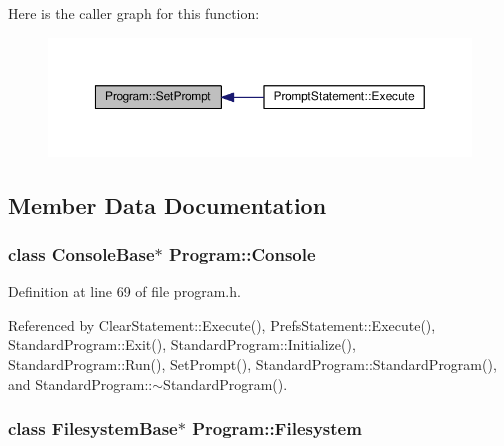 Here is the caller graph for this function\+:
\nopagebreak
\begin{figure}[H]
\begin{center}
\leavevmode
\includegraphics[width=350pt]{dc/db5/classProgram_a517c5f08c0c0dd7f79de6fbf0e62aac6_icgraph}
\end{center}
\end{figure}




\subsection{Member Data Documentation}
\subsubsection[{\texorpdfstring{Console}{Console}}]{\setlength{\rightskip}{0pt plus 5cm}class {\bf Console\+Base}$\ast$ Program\+::\+Console}\hypertarget{classProgram_a7edba60e839230f20ce29716567bc892}{}\label{classProgram_a7edba60e839230f20ce29716567bc892}


Definition at line 69 of file program.\+h.



Referenced by Clear\+Statement\+::\+Execute(), Prefs\+Statement\+::\+Execute(), Standard\+Program\+::\+Exit(), Standard\+Program\+::\+Initialize(), Standard\+Program\+::\+Run(), Set\+Prompt(), Standard\+Program\+::\+Standard\+Program(), and Standard\+Program\+::$\sim$\+Standard\+Program().

\subsubsection[{\texorpdfstring{Filesystem}{Filesystem}}]{\setlength{\rightskip}{0pt plus 5cm}class {\bf Filesystem\+Base}$\ast$ Program\+::\+Filesystem}\hypertarget{classProgram_a54fb0dc3ee40a356fe91cea64e569b26}{}\label{classProgram_a54fb0dc3ee40a356fe91cea64e569b26}


